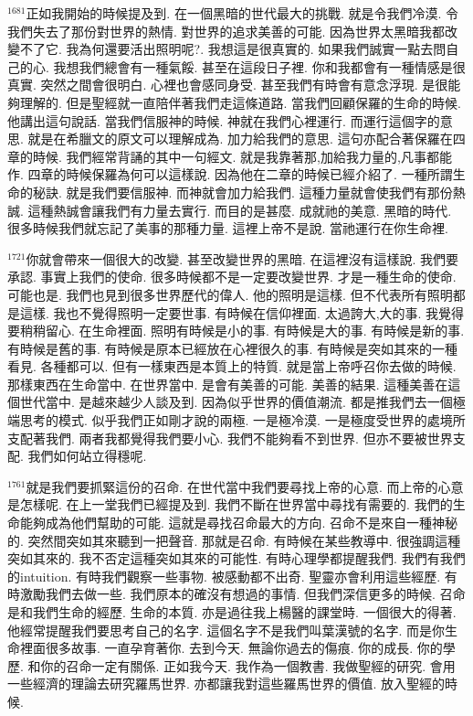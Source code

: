\documentclass{book}
\begin{document}
$^{1681}$正如我開始的時候提及到.
在一個黑暗的世代最大的挑戰.
就是令我們冷漠.
令我們失去了那份對世界的熱情.
對世界的追求美善的可能.
因為世界太黑暗我都改變不了它.
我為何還要活出照明呢?.
我想這是很真實的.
如果我們誠實一點去問自己的心.
我想我們總會有一種氣餒.
甚至在這段日子裡.
你和我都會有一種情感是很真實.
突然之間會很明白.
心裡也會感同身受.
甚至我們有時會有意念浮現.
是很能夠理解的.
但是聖經就一直陪伴著我們走這條道路.
當我們回顧保羅的生命的時候.
他講出這句說話.
當我們信服神的時候.
神就在我們心裡運行.
而運行這個字的意思.
就是在希臘文的原文可以理解成為.
加力給我們的意思.
這句亦配合著保羅在四章的時候.
我們經常背誦的其中一句經文.
就是我靠著那,加給我力量的,凡事都能作.
四章的時候保羅為何可以這樣說.
因為他在二章的時候已經介紹了.
一種所謂生命的秘訣.
就是我們要信服神.
而神就會加力給我們.
這種力量就會使我們有那份熱誠.
這種熱誠會讓我們有力量去實行.
而目的是甚麼.
成就祂的美意.
黑暗的時代.
很多時候我們就忘記了美事的那種力量.
這裡上帝不是說.
當祂運行在你生命裡.

$^{1721}$你就會帶來一個很大的改變.
甚至改變世界的黑暗.
在這裡沒有這樣說.
我們要承認.
事實上我們的使命.
很多時候都不是一定要改變世界.
才是一種生命的使命.
可能也是.
我們也見到很多世界歷代的偉人.
他的照明是這樣.
但不代表所有照明都是這樣.
我也不覺得照明一定要世事.
有時候在信仰裡面.
太過誇大,大的事.
我覺得要稍稍留心.
在生命裡面.
照明有時候是小的事.
有時候是大的事.
有時候是新的事.
有時候是舊的事.
有時候是原本已經放在心裡很久的事.
有時候是突如其來的一種看見.
各種都可以.
但有一樣東西是本質上的特質.
就是當上帝呼召你去做的時候.
那樣東西在生命當中.
在世界當中.
是會有美善的可能.
美善的結果.
這種美善在這個世代當中.
是越來越少人談及到.
因為似乎世界的價值潮流.
都是推我們去一個極端思考的模式.
似乎我們正如剛才說的兩極.
一是極冷漠.
一是極度受世界的處境所支配著我們.
兩者我都覺得我們要小心.
我們不能夠看不到世界.
但亦不要被世界支配.
我們如何站立得穩呢.

$^{1761}$就是我們要抓緊這份的召命.
在世代當中我們要尋找上帝的心意.
而上帝的心意是怎樣呢.
在上一堂我們已經提及到.
我們不斷在世界當中尋找有需要的.
我們的生命能夠成為他們幫助的可能.
這就是尋找召命最大的方向.
召命不是來自一種神秘的.
突然間突如其來聽到一把聲音.
那就是召命.
有時候在某些教導中.
很強調這種突如其來的.
我不否定這種突如其來的可能性.
有時心理學都提醒我們.
我們有我們的intuition.
有時我們觀察一些事物.
被感動都不出奇.
聖靈亦會利用這些經歷.
有時激勵我們去做一些.
我們原本的確沒有想過的事情.
但我們深信更多的時候.
召命是和我們生命的經歷.
生命的本質.
亦是過往我上楊醫的課堂時.
一個很大的得著.
他經常提醒我們要思考自己的名字.
這個名字不是我們叫葉漢號的名字.
而是你生命裡面很多故事.
一直孕育著你.
去到今天.
無論你過去的傷痕.
你的成長.
你的學歷.
和你的召命一定有關係.
正如我今天.
我作為一個教書.
我做聖經的研究.
會用一些經濟的理論去研究羅馬世界.
亦都讓我對這些羅馬世界的價值.
放入聖經的時候.
\end{document}
